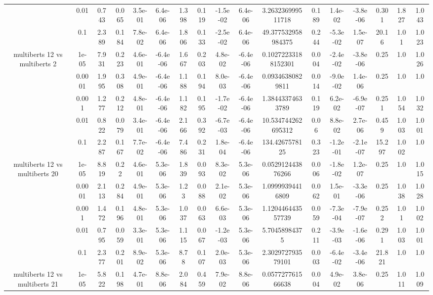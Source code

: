 \begin{tabular}{|c|c|c|c|c|c|c|c|c|c|c|c|c|c|c|c|c|}
 & 0.01 & 0.743 & 0.065 & 3.5e-01 & 6.4e-06 & 1.398 & 0.119 & -1.5e-02 & 6.4e-06 & 3.263236999511718 & 0.189 & 1.4e-02 & -3.8e-06 & 0.301 & 1.827 & 1.043 \\
 & 0.1 & 2.389 & 0.184 & 7.8e-02 & 6.4e-06 & 1.806 & 0.133 & -2.5e-02 & 6.4e-06 & 49.377532958984375 & 0.244 & -5.3e-02 & 1.5e-07 & 20.16 & 1.01 & 1.023 \\
\hline
\multirow{5}{*}{multiberts 12 vs multiberts 2} & 1e-05 & 7.931 & 0.223 & 4.6e-01 & -6.4e-06 & 1.667 & 0.203 & 4.8e-02 & -6.4e-06 & 0.10272233188152301 & 0.004 & -2.4e-02 & -3.8e-06 & 0.25 & 1.0 & 1.026 \\
 & 0.0001 & 1.995 & 0.308 & 4.9e-01 & -6.4e-06 & 1.188 & 0.194 & 8.0e-03 & -6.4e-06 & 0.09346380829811 & 0.014 & -9.0e-02 & 1.4e-06 & 0.25 & 1.0 & 1.0 \\
 & 0.001 & 1.277 & 0.212 & 4.8e-01 & -6.4e-06 & 1.182 & 0.195 & -1.7e-02 & -6.4e-06 & 1.38443374633789 & 0.119 & 6.2e-02 & -6.9e-07 & 0.251 & 1.054 & 1.032 \\
 & 0.01 & 0.822 & 0.079 & 3.4e-01 & -6.4e-06 & 2.166 & 0.392 & -6.7e-03 & -6.4e-06 & 10.534744262695312 & 0.06 & 8.8e-02 & 2.7e-06 & 0.459 & 1.003 & 1.001 \\
 & 0.1 & 2.287 & 0.167 & 7.7e-02 & -6.4e-06 & 7.486 & 0.231 & 1.8e-04 & -6.4e-06 & 134.4267578125 & 0.323 & -1.2e-01 & -2.1e-07 & 15.297 & 1.002 & 1.0 \\
\hline
\multirow{5}{*}{multiberts 12 vs multiberts 20} & 1e-05 & 8.819 & 0.22 & 4.6e-01 & 5.3e-06 & 1.839 & 0.093 & 8.3e-02 & 5.3e-06 & 0.052912443876266 & 0.006 & -1.8e-02 & 1.2e-07 & 0.25 & 1.0 & 1.015 \\
 & 0.0001 & 2.113 & 0.284 & 4.9e-01 & 5.3e-06 & 1.23 & 0.088 & 2.1e-02 & 5.3e-06 & 1.09999394416809 & 0.062 & 1.5e-01 & -3.3e-06 & 0.25 & 1.038 & 1.028 \\
 & 0.001 & 1.472 & 0.196 & 4.8e-01 & 5.3e-06 & 1.037 & 0.063 & 6.6e-03 & 5.3e-06 & 1.120446443557739 & 0.059 & -7.3e-04 & -7.9e-07 & 0.252 & 1.01 & 1.002 \\
 & 0.01 & 0.795 & 0.059 & 3.3e-01 & 5.3e-06 & 1.115 & 0.067 & -1.2e-03 & 5.3e-06 & 5.70458984375 & 0.211 & -3.9e-03 & -1.6e-06 & 0.291 & 1.003 & 1.001 \\
 & 0.1 & 2.377 & 0.201 & 8.9e-02 & 5.3e-06 & 8.78 & 0.107 & 2.0e-03 & 5.3e-06 & 2.302972793579101 & 0.003 & -6.4e-02 & -3.4e-06 & 21.821 & 1.0 & 1.0 \\
\hline
\multirow{5}{*}{multiberts 12 vs multiberts 21} & 1e-05 & 5.822 & 0.198 & 4.7e-01 & 8.8e-06 & 2.084 & 0.459 & 7.9e-02 & 8.8e-06 & 0.057727761566638 & 0.004 & 4.9e-02 & 3.8e-06 & 0.25 & 1.011 & 1.009 \\

\end{tabular}
